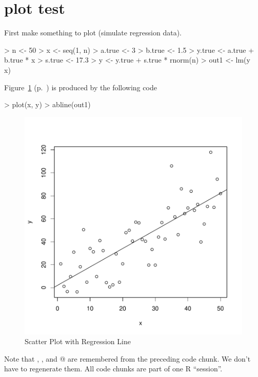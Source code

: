 \documentclass{article}
\begin{document}


\section*{plot test}

First make something to plot
(simulate regression data).
\begin{Schunk}
\begin{Sinput}
> n <- 50
> x <- seq(1, n)
> a.true <- 3
> b.true <- 1.5
> y.true <- a.true + b.true * x
> s.true <- 17.3
> y <- y.true + s.true * rnorm(n)
> out1 <- lm(y ~ x)
\end{Sinput}
\end{Schunk}


Figure~\ref{fig:one} (p.~\pageref{fig:one})
is produced by the following code
\begin{Schunk}
\begin{Sinput}
> plot(x, y)
> abline(out1)
\end{Sinput}
\end{Schunk}

\begin{figure}[h!]
  \centering
\includegraphics{plot_test-fig1}

\caption{Scatter Plot with Regression Line}
\label{fig:one}
\end{figure}
Note that \verb@x@, \verb@y@, and @ are remembered from
the preceding code chunk.  We don't have to regenerate them.
All code chunks are part of one R ``session''.
\end{document}
